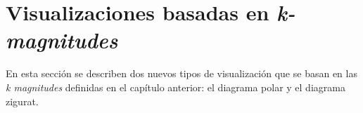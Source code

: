 %
%
%
%
%
%
%

\clearpage
\section{Visualizaciones basadas en \textit{k-magnitudes}}

En esta sección se describen dos nuevos tipos de visualización que se basan en las \textit{k magnitudes} definidas en el capítulo anterior: el diagrama polar y el diagrama zigurat.

